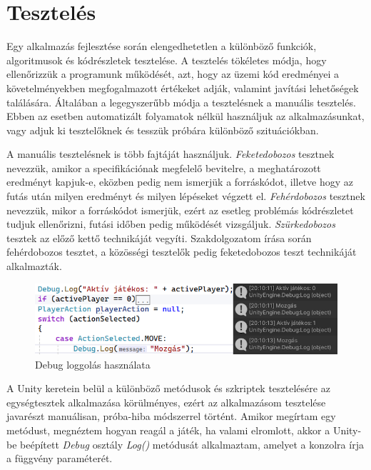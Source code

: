 \documentclass[
]{thesis-ekf}
\theoremstyle{definition}
\theoremstyle{remark}
\begin{document}


\chapter{Tesztelés}

Egy alkalmazás fejlesztése során elengedhetetlen a különböző funkciók, algoritmusok és kódrészletek tesztelése. A tesztelés tökéletes módja, hogy ellenőrizzük a programunk működését, azt, hogy az üzemi kód eredményei a követelményekben megfogalmazott értékeket adják, valamint javítási lehetőségek találására. Általában a legegyszerűbb módja a tesztelésnek a manuális tesztelés. Ebben az esetben automatizált folyamatok nélkül használjuk az alkalmazásunkat, vagy adjuk ki tesztelőknek és tesszük próbára különböző szituációkban.

A manuális tesztelésnek is több fajtáját használjuk. \emph{Feketedobozos} tesztnek nevezzük, amikor a specifikációnak megfelelő bevitelre, a meghatározott eredményt kapjuk-e, eközben pedig nem ismerjük a forráskódot, illetve hogy az futás után milyen eredményt és milyen lépéseket végzett el. \emph{Fehérdobozos} tesztnek nevezzük, mikor a forráskódot ismerjük, ezért az esetleg problémás kódrészletet tudjuk ellenőrizni, futási időben pedig működését vizsgáljuk. \emph{Szürkedobozos} tesztek az előző kettő technikáját vegyíti. Szakdolgozatom írása során fehérdobozos tesztet, a közösségi tesztelők pedig feketedobozos teszt technikáját alkalmazták. \cite{BlackboxEn,WhiteboxEn,GrayboxEn}

\begin{figure}[h!]
	\centering
	\includegraphics[width=14cm]{./pictures/game_debug.png}
	\caption{Debug loggolás használata}
	\label{debug}
\end{figure}

A Unity keretein belül a különböző metódusok és szkriptek tesztelésére az egységtesztek alkalmazása körülményes, ezért az alkalmazásom tesztelése javarészt manuálisan, próba-hiba módszerrel történt. Amikor megírtam egy metódust, megnéztem hogyan reagál a játék, ha valami elromlott, akkor a Unity-be beépített \emph{Debug} osztály \emph{Log()} metódusát alkalmaztam, amelyet a konzolra írja a függvény paraméterét. \cite{UnityDocsDebug}
\end{document}
